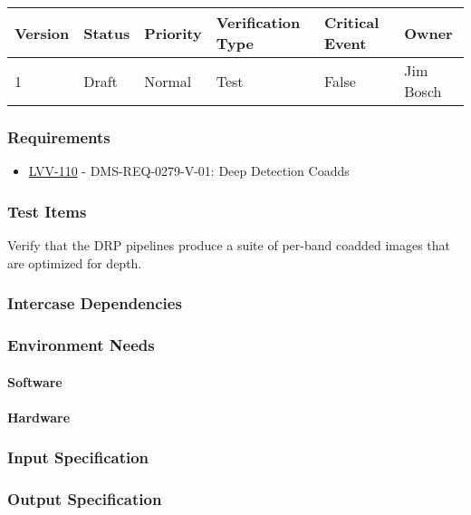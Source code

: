 \begin{longtable}[]{llllll}
\toprule
Version & Status & Priority & Verification Type & Critical Event & Owner
\\\midrule
1 & Draft & Normal &
Test & False & Jim Bosch
\\\bottomrule
\end{longtable}

\subsubsection{Requirements}
\begin{itemize}
\item \href{https://jira.lsstcorp.org/browse/LVV-110}{LVV-110} - DMS-REQ-0279-V-01: Deep Detection Coadds
\end{itemize}

\subsubsection{Test Items}
Verify that the DRP pipelines produce a suite of per-band coadded images
that are optimized for depth.



\subsubsection{Intercase Dependencies}

\subsubsection{Environment Needs}

\paragraph{Software}

\paragraph{Hardware}

\subsubsection{Input Specification}

\subsubsection{Output Specification}

